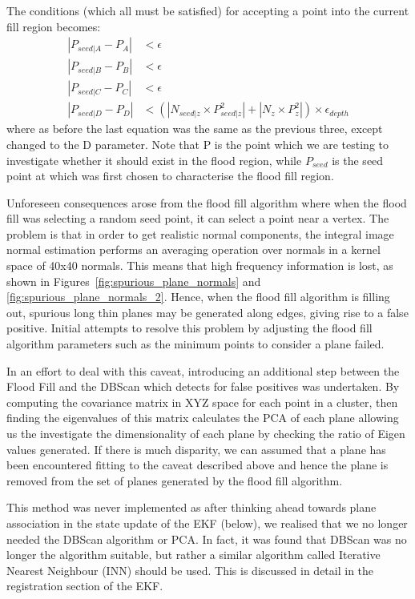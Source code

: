 \documentclass[]{article}
\begin{document}
{The conditions (which all must be satisfied) for accepting a point into the current fill region becomes:
\begin{align}
|P_{seed|A} - P_{A}| &< \epsilon \\
|P_{seed|B} - P_{B}| &< \epsilon\\
|P_{seed|C} - P_{C}| &< \epsilon\\
|P_{seed|D}-P_{D}| &< (|N_{seed|z} \times P^{2}_{seed|z}| + |N_{z} \times P^{2}_{z}|) \times \epsilon_{depth}
\end{align}
where as before the last equation was the same as the previous three, except changed to the D parameter.
Note that P is the point which we are testing to investigate whether it should exist in the flood region, while $P_{seed}$ is the seed point at which was first chosen to characterise the flood fill region. 

Unforeseen consequences arose from the flood fill algorithm where when the flood fill was selecting a random seed point, it can select a point near a vertex. The problem is that in order to get realistic normal components, the integral image normal estimation performs an averaging operation over normals in a kernel space of 40x40 normals. This means that high frequency information is lost, as shown in Figures~\ref{fig:spurious_plane_normals} and \ref{fig:spurious_plane_normals_2}. Hence, when the flood fill algorithm is filling out, spurious long thin planes may be generated along edges, giving rise to a false positive. Initial attempts to resolve this problem by adjusting the flood fill algorithm parameters such as the minimum points to consider a plane failed.

In an effort to deal with this caveat, introducing an additional step between the Flood Fill and the DBScan which detects for false positives was undertaken. By computing the covariance matrix in XYZ space for each point in a cluster, then finding the eigenvalues of this matrix calculates the PCA of each plane allowing us the investigate the dimensionality of each plane by checking the ratio of Eigen values generated. If there is much disparity, we can assumed that a plane has been encountered fitting to the caveat described above and hence the plane is removed from the set of planes generated by the flood fill algorithm. 

This method was never implemented as after thinking ahead towards plane association in the state update of the EKF (below), we realised that we no longer needed the DBScan algorithm or PCA.  In fact, it was found that DBScan was no longer the algorithm suitable, but rather a similar algorithm called Iterative Nearest Neighbour (INN) should be used. This is discussed in detail in the registration section of the EKF.












}
\end{document}
